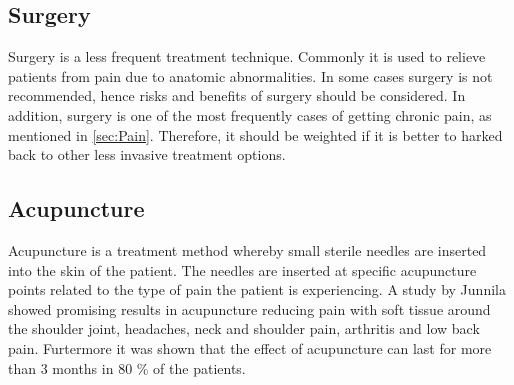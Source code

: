 \subsection{Surgery}
Surgery is a less frequent treatment technique. Commonly it is used to relieve patients from pain due to anatomic abnormalities. \cite{marcus2009,pope2017} In some cases surgery is not recommended, hence risks and benefits of surgery should be considered. In addition, surgery is one of the most frequently cases of getting chronic pain, as mentioned in \autoref{sec:Pain}. Therefore, it should be weighted if it is better to harked back to other less invasive treatment options. \cite{pope2017}


\subsection{Acupuncture}
Acupuncture is a treatment method whereby small sterile needles are inserted into the skin of the patient. The needles are inserted at specific acupuncture points related to the type of pain the patient is experiencing. \cite{Dhanani2011} A study by Junnila \cite{Junnilla1983} showed promising results in acupuncture reducing pain with soft tissue around the shoulder joint, headaches, neck and shoulder pain, arthritis and low back pain.  Furtermore it was shown that the effect of acupuncture can last for more than 3 months in 80 \% of the patients. \cite{Junnilla1983} 



